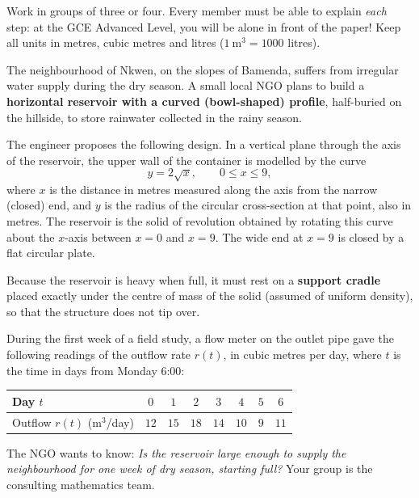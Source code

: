 \documentclass[11pt]{article}
\newcommand{\cle}[1]{{\popxbold\color{popdark}#1}}
\newcounter{popsec}
\newcounter{popsub}
\newcommand{\courssub}[1]{%
  \stepcounter{popsub}%
  \par\vspace{9pt}\noindent{\popxbold\fontsize{11.5}{13}\selectfont\color{popink}{\color{poporange}\thepopsec.\thepopsub}\hspace{6pt}#1}\par\nopagebreak\vspace{4pt}
}
\begin{document}
\begin{attention}
Work in groups of three or four. Every member must be able to explain \emph{each} step: at the GCE Advanced Level, you will be alone in front of the paper! Keep all units in metres, cubic metres and litres ($1\ \mathrm{m^3}=1000$ litres).
\end{attention}

\courssub{Situation}

The neighbourhood of Nkwen, on the slopes of Bamenda, suffers from irregular water supply during the dry season. A small local NGO plans to build a \textbf{horizontal reservoir with a curved (bowl-shaped) profile}, half-buried on the hillside, to store rainwater collected in the rainy season.

The engineer proposes the following design. In a vertical plane through the axis of the reservoir, the upper wall of the container is modelled by the curve
\[
y=2\sqrt{x},\qquad 0\le x\le 9,
\]
where $x$ is the distance in metres measured along the axis from the narrow (closed) end, and $y$ is the radius of the circular cross-section at that point, also in metres. The reservoir is the \cle{solid of revolution} obtained by rotating this curve about the $x$-axis between $x=0$ and $x=9$. The wide end at $x=9$ is closed by a flat circular plate.

Because the reservoir is heavy when full, it must rest on a \textbf{support cradle} placed exactly under the \cle{centre of mass} of the solid (assumed of uniform density), so that the structure does not tip over.

During the first week of a field study, a flow meter on the outlet pipe gave the following readings of the outflow rate $r(t)$, in cubic metres per day, where $t$ is the time in days from Monday 6:00:

\begin{center}
\begin{tabular}{|l|c|c|c|c|c|c|c|}
\hline
\rowcolor{popblueL} Day $t$ & $0$ & $1$ & $2$ & $3$ & $4$ & $5$ & $6$ \\
\hline Outflow $r(t)$ (m$^3$/day) & $12$ & $15$ & $18$ & $14$ & $10$ & $9$ & $11$ \\
\hline
\end{tabular}
\end{center}

The NGO wants to know: \emph{Is the reservoir large enough to supply the neighbourhood for one week of dry season, starting full?} Your group is the consulting mathematics team.
\end{document}
